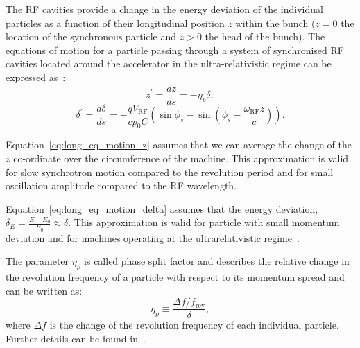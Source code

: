The RF cavities provide a change in the energy deviation of the individual particles as a function of their longitudinal position $z$ within the bunch ($z=0$ the location of the synchronous particle and $z>0$ the head of the bunch). The equations of motion for a particle passing through a system of synchronised RF cavities located around the accelerator in the ultra-relativistic regime can be expressed as~\cite{wolski2014}:
\begin{equation}\label{eq:long_eq_motion_z}
    z^\prime = \frac{dz}{ds} = - \eta_p \delta,
\end{equation}
\begin{equation}\label{eq:long_eq_motion_delta}
    \delta^\prime = \frac{d\delta}{ds} = - \frac{qV_\mathrm{RF}}{c p_0 C} \left ( \sin{\phi_s} - \sin{\left ( \phi_s - \frac{\omega_\mathrm{RF} z}{c} \right)} \right ).
\end{equation}

Equation~\eqref{eq:long_eq_motion_z} assumes that we can average the change of the $z$ co-ordinate over the circumference of the machine. This approximation is valid for slow synchrotron motion compared to the revolution period and for small oscillation amplitude compared to the RF wavelength\cite{wolski2014}. %

Equation~\eqref{eq:long_eq_motion_delta} assumes that the energy deviation, $\delta_E =\frac{E-E_0}{E_0} \approx \delta$. This approximation is valid for particle with small momentum deviation and for machines operating at the ultrarelativistic regime~\cite{wolski2014}. %


The parameter $\eta_p$ is called phase split factor and describes the relative change in the revolution frequency of a particle with respect to its momentum spread and can be written as:
\begin{equation}\label{eq:phase_slip_def}
    \eta_p \equiv \frac{\Delta f/f_\mathrm{rev}}{\delta},
\end{equation}
where $\Delta f$ is the change of the revolution frequency of each individual particle. Further details can be found in~\cite{wolski2014}.


